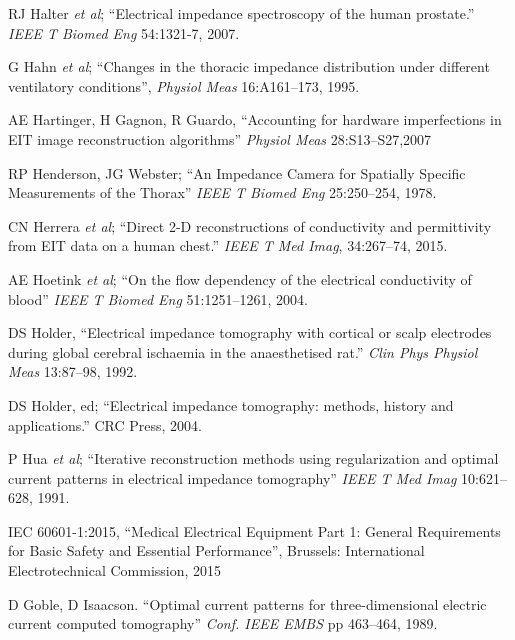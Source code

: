 \documentclass[10pt,journal]{IEEEtran}\def\TBLWIDA{15mm}\def\TBLWIDB{60mm}
\newcommand{\ifmaxthree}[2]{#2 {\em et al}; }
\begin{document}
\begin{thebibliography}{00}
\ifmaxthree{
RJ Halter, A Hartov, JA Heaney, KD Paulsen, AR Schned
}{
RJ Halter
}
``Electrical impedance spectroscopy of the human prostate.''
{\em IEEE T Biomed Eng} 54:1321-7, 2007. %

\ifmaxthree{
Hahn G, Šipinková I, Baisch F, Hellige G.
}{
G Hahn
}
``Changes in the thoracic impedance distribution under different ventilatory conditions'',
{\em Physiol Meas} 16:A161--173, 1995.

AE Hartinger, H Gagnon, R Guardo,
``Accounting for hardware imperfections in EIT image reconstruction algorithms''
{\em  Physiol Meas} 28:S13--S27,2007

RP Henderson, JG Webster;
``An Impedance Camera for Spatially Specific Measurements of the Thorax''
{\em IEEE T Biomed Eng} 25:250--254, 1978.

\ifmaxthree{
CN Herrera, MF Vallejo, JL Mueller, RG Lima;
}{
CN Herrera
}
``Direct 2-D reconstructions of conductivity and permittivity from EIT data on a human chest.''
{\em IEEE T Med Imag}, 34:267--74, 2015.

\ifmaxthree{
AE Hoetink, TJ Faes, KR Visser, RM Heethaar,
}{
AE Hoetink
}
``On the flow dependency of the electrical conductivity of blood''
{\em  IEEE T Biomed Eng} 51:1251--1261, 2004.

DS Holder,
``Electrical impedance tomography with cortical or scalp electrodes during global cerebral ischaemia in the anaesthetised rat.''
{\em Clin Phys Physiol Meas} 13:87--98, 1992. %

DS Holder, ed;
``Electrical impedance tomography: methods, history and applications.''
CRC Press, 2004.


\ifmaxthree{
P Hua, EJ Woo, JG Webster,  WJ Tompkins,
}{
P Hua
}
``Iterative reconstruction methods using regularization and optimal current patterns in electrical impedance tomography''
{\em  IEEE T Med Imag} 10:621--628, 1991.

IEC 60601-1:2015,
 ``Medical Electrical Equipment Part 1:  General Requirements for
Basic Safety and Essential Performance'',
Brussels: International Electrotechnical Commission, 2015

D Goble, D Isaacson.
``Optimal current patterns for three-dimensional electric current computed tomography''
{\em Conf. IEEE EMBS} pp 463--464, 1989.


\end{thebibliography}
\end{document}
